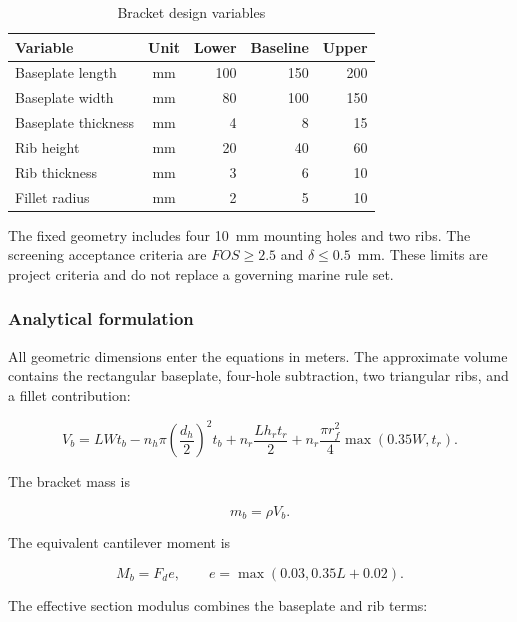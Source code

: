 \begin{table}[H]
\centering
\caption{Bracket design variables}
\label{tab:bracket-parameters}
\begin{tabularx}{\textwidth}{Xcrrr}
\toprule
\textbf{Variable} & \textbf{Unit} & \textbf{Lower} & \textbf{Baseline} &
\textbf{Upper}\\
\midrule
Baseplate length & mm & 100 & 150 & 200\\
Baseplate width & mm & 80 & 100 & 150\\
Baseplate thickness & mm & 4 & 8 & 15\\
Rib height & mm & 20 & 40 & 60\\
Rib thickness & mm & 3 & 6 & 10\\
Fillet radius & mm & 2 & 5 & 10\\
\bottomrule
\end{tabularx}
\end{table}

The fixed geometry includes four 10~mm mounting holes and two ribs. The
screening acceptance criteria are $FOS\geq2.5$ and
$\delta\leq0.5$~mm. These limits are project criteria and do not replace a
governing marine rule set.

\subsubsection{Analytical formulation}
\label{sec:bracket-model}

All geometric dimensions enter the equations in meters. The approximate
volume contains the rectangular baseplate, four-hole subtraction, two
triangular ribs, and a fillet contribution:

\begin{equation}
V_b =
LWt_b
-n_h\pi\left(\frac{d_h}{2}\right)^2t_b
+n_r\frac{Lh_rt_r}{2}
+n_r\frac{\pi r_f^2}{4}\max(0.35W,t_r).
\label{eq:bracket-volume}
\end{equation}

The bracket mass is

\begin{equation}
m_b=\rho V_b.
\label{eq:bracket-mass}
\end{equation}

The equivalent cantilever moment is

\begin{equation}
M_b=F_de,\qquad
e=\max(0.03,0.35L+0.02).
\label{eq:bracket-moment}
\end{equation}

The effective section modulus combines the baseplate and rib terms:

